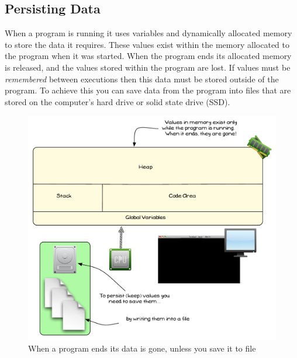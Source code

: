 \subsection{Persisting Data} %
\label{sub:persisting_data}

When a program is running it uses variables and dynamically allocated memory to store the data it requires. These values exist within the memory allocated to the program when it was started. When the program ends its allocated memory is released, and the values stored within the program are lost. If values must be \emph{remembered} between executions then this data must be stored outside of the program. To achieve this you can save data from the program into files that are stored on the computer's hard drive or solid state drive (SSD).

\begin{figure}[h]
   \centering
   \includegraphics[width=\textwidth]{./topics/file-io/diagrams/PersistData} 
   \caption{When a program ends its data is gone, unless you save it to file}
   \label{fig:persist-data}
\end{figure}


